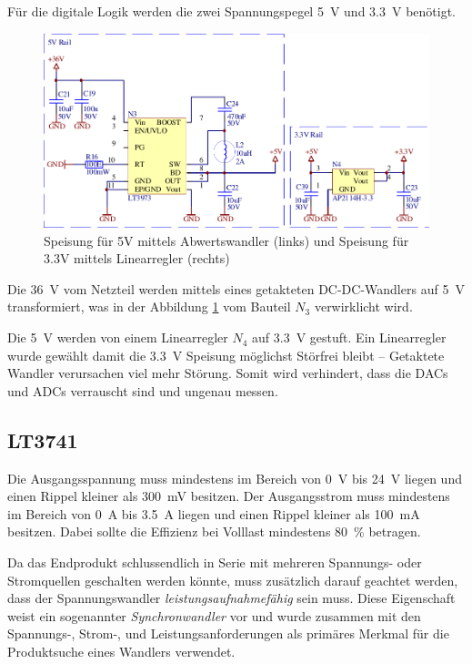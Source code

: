 F\"ur die digitale  Logik  werden  die  zwei  Spannungspegel  \SI{5}{\volt}  und
\SI{3.3}{\volt} ben\"otigt. 

\begin{figure}[th!]
    \center
    \includegraphics[width=.75\textwidth]{images/circuit/5v-3v-rails.pdf}
    \caption{Speisung f\"ur 5V mittels Abwertswandler (links) und Speisung f\"ur 3.3V mittels Linearregler (rechts)}
    \label{fig:circuit:rails}
\end{figure}

Die  \SI{36}{\volt} vom Netzteil werden mittels eines getakteten  DC-DC-Wandlers
auf \SI{5}{\volt} transformiert,  was  in  der Abbildung \ref{fig:circuit:rails}
vom Bauteil $N_3$ verwirklicht wird.

Die  \SI{5}{\volt}  werden  von  einem  Linearregler  $N_4$ auf  \SI{3.3}{\volt}
gestuft. Ein Linearregler wurde  gew\"ahlt  damit  die  \SI{3.3}{\volt} Speisung
m\"oglichst  St\"orfrei  bleibt  --  Getaktete  Wandler  verursachen  viel  mehr
St\"orung. Somit  wird  verhindert,  dass  die DACs und ADCs verrauscht sind und
ungenau messen.

\subsection{LT3741}

Die  Ausgangsspannung   muss   mindestens   im  Bereich  von  \SI{0}{\volt}  bis
\SI{24}{\volt}  liegen  und   einen  Rippel  kleiner  als  \SI{300}{\milli\volt}
besitzen.  Der  Ausgangsstrom muss mindestens im Bereich von \SI{0}{\ampere} bis
\SI{3.5}{\ampere} liegen  und  einen  Rippel kleiner als \SI{100}{\milli\ampere}
besitzen. Dabei  sollte  die Effizienz bei Volllast mindestens \SI{80}{\percent}
betragen.

Da  das  Endprodukt  schlussendlich  in  Serie  mit  mehreren   Spannungs-  oder
Stromquellen  geschalten  werden  k\"onnte, muss  zus\"atzlich  darauf  geachtet
werden,  dass  der Spannungswandler \emph{leistungsaufnahmef\"ahig}  sein  muss.
Diese Eigenschaft weist  ein  sogenannter  \emph{Synchronwandler}  vor und wurde
zusammen mit den Spannungs-,  Strom-,  und Leistungsanforderungen als prim\"ares
Merkmal f\"ur die Produktsuche eines Wandlers verwendet.


